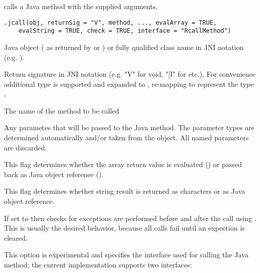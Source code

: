 \begin{Description}\relax
{} calls a Java method with the supplied arguments.
\end{Description}
\begin{Usage}
\begin{verbatim}
.jcall(obj, returnSig = "V", method, ..., evalArray = TRUE, 
    evalString = TRUE, check = TRUE, interface = "RcallMethod")
\end{verbatim}
\end{Usage}
\begin{Arguments}
\begin{ldescription}
\item[\code{obj}] Java object ( as returned by
 or ) or fully qualified
class name in JNI notation (e.g. ).
\item[\code{returnSig}] Return signature in JNI notation (e.g. "V" for void,
"[I" for  etc.). For convenience additional type
 is supported and expanded to
, re-mapping  to represent the
type .
\item[\code{method}] The name of the method to be called
\item[\code{...}] Any parametes that will be passed to the Java method. The parameter
types are determined automatically and/or taken from the
 object. All named parameters are discarded.
\item[\code{evalArray}] This flag determines whether the array return value
is evaluated () or passed back as Java object reference
().
\item[\code{evalString}] This flag determines whether string result is returned
as characters or as Java object reference.
\item[\code{check}] If set to  then checks for exceptions are
performed before and after the call using
. This is usually the desired
behavior, because all calls fail until an expection is cleared.
\item[\code{interface}] This option is experimental and specifies the
interface used for calling the Java method; the current
implementation supports two interfaces:

\end{ldescription}
\end{Arguments}
